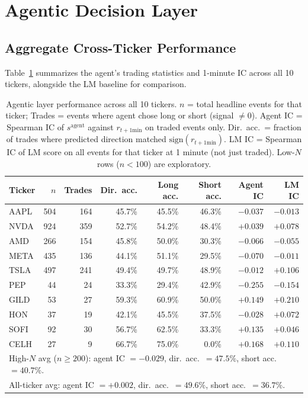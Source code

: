 \documentclass[11pt, letterpaper]{article}
\begin{document}
\section{Agentic Decision Layer}
\label{sec:agent}

\subsection{Aggregate Cross-Ticker Performance}

Table~\ref{tab:agent_cross} summarizes the agent's trading statistics and 1-minute IC
across all 10 tickers, alongside the LM baseline for comparison.

\begin{table}[h]
\centering
\small
\caption{Agentic layer performance across all 10 tickers. $n$ = total headline events
for that ticker; Trades = events where agent chose long or short (signal $\neq 0$).
Agent IC = Spearman IC of $s^{\mathrm{agent}}$ against $r_{t+1\text{min}}$ on traded
events only. Dir.\ acc.\ = fraction of trades where predicted direction matched
$\mathrm{sign}(r_{t+1\text{min}})$. LM IC = Spearman IC of LM score on all events
for that ticker at 1 minute (not just traded). Low-$N$ rows ($n < 100$) are
exploratory.}
\label{tab:agent_cross}
\begin{tabular}{lrrrrrrr}
\toprule
Ticker & $n$ & Trades & Dir.\ acc. & Long acc. & Short acc. & Agent IC & LM IC \\
\midrule
AAPL  & 504 & 164 & 45.7\% & 45.5\% & 46.3\% & $-0.037$ & $-0.013$ \\
NVDA  & 924 & 359 & 52.7\% & 54.2\% & 48.4\% & $+0.039$ & $+0.078$ \\
AMD   & 266 & 154 & 45.8\% & 50.0\% & 30.3\% & $-0.066$ & $-0.055$ \\
META  & 435 & 136 & 44.1\% & 51.1\% & 29.5\% & $-0.070$ & $-0.011$ \\
TSLA  & 497 & 241 & 49.4\% & 49.7\% & 48.9\% & $-0.012$ & $+0.106$ \\
\midrule
PEP   &  44 &  24 & 33.3\% & 29.4\% & 42.9\% & $-0.255$ & $-0.154$ \\
GILD  &  53 &  27 & 59.3\% & 60.9\% & 50.0\% & $+0.149$ & $+0.210$ \\
HON   &  37 &  19 & 42.1\% & 45.5\% & 37.5\% & $-0.028$ & $+0.072$ \\
SOFI  &  92 &  30 & 56.7\% & 62.5\% & 33.3\% & $+0.135$ & $+0.046$ \\
CELH  &  27 &   9 & 66.7\% & 75.0\% & 0.0\%  & $+0.168$ & $+0.110$ \\
\midrule
\multicolumn{8}{l}{\footnotesize High-$N$ avg ($n \geq 200$): agent IC $= -0.029$,
dir.\ acc.\ $= 47.5\%$, short acc.\ $= 40.7\%$.} \\
\multicolumn{8}{l}{\footnotesize All-ticker avg: agent IC $= +0.002$,
dir.\ acc.\ $= 49.6\%$, short acc.\ $= 36.7\%$.} \\
\bottomrule
\end{tabular}
\end{table}
\end{document}
